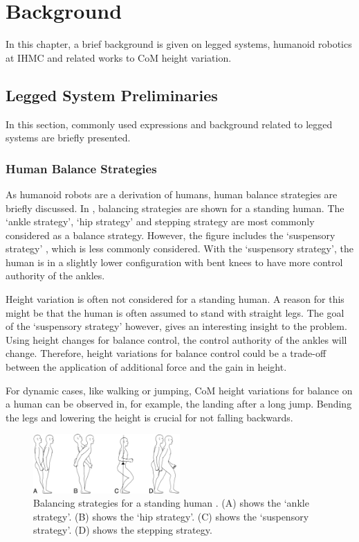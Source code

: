 %
\chapter{Background}\label{chap:background}
In this chapter, a brief background is given on legged systems, humanoid robotics at \ac{IHMC} and related works to \ac{CoM} height variation.
\section{Legged System Preliminaries}
In this section, commonly used expressions and background related to legged systems are briefly presented.
\subsection{Human Balance Strategies}
As humanoid robots are a derivation of humans, human balance strategies are briefly discussed. In , balancing strategies are shown for a standing human. The `ankle strategy', `hip strategy' and stepping strategy are most commonly considered as a balance strategy. However, the figure includes the `suspensory strategy' \cite{hasson1994clinical}, which is less commonly considered. With the `suspensory strategy', the human is in a slightly lower configuration with bent knees to have more control authority of the ankles.

Height variation is often not considered for a standing human. A reason for this might be that the human is often assumed to stand with straight legs. The goal of the `suspensory strategy' however, gives an interesting insight to the problem. Using height changes for balance control, the control authority of the ankles will change. Therefore, height variations for balance control could be a trade-off between the application of additional force and the gain in height. 

For dynamic cases, like walking or jumping, \ac{CoM} height variations for balance on a human can be observed in, for example, the landing after a long jump. Bending the legs and lowering the height is crucial for not falling backwards.
\begin{figure}
\centering
\includegraphics[width=0.5\textwidth]{STYLESTUFF/humanbalance.jpg}
\caption{Balancing strategies for a standing human \cite{hasson1994clinical}. (A) shows the `ankle strategy'. (B) shows the `hip strategy'. (C) shows the `suspensory strategy'. (D) shows the stepping strategy.}
\label{fig:human}
\end{figure}

